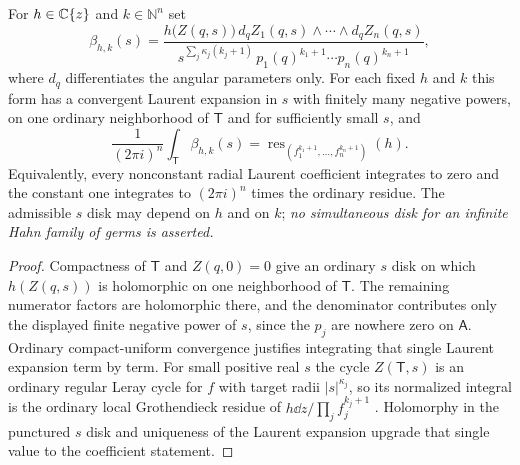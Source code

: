 \documentclass[11pt,letterpaper]{article}
\theoremstyle{definition}
\theoremstyle{remark}
\newcommand{\N}{\mathbb N}\newcommand{\Z}{\mathbb Z}\newcommand{\DD}{\mathbb D}
\newcommand{\res}{\operatorname{res}}\newcommand{\wind}{\operatorname{wind}}
\numberwithin{equation}{section}
\begin{document}
\begin{lemma}
\label{contours:lem:constantperiod}
For $h\in\mathbb C\{z\}$ and $k\in\N^n$ set
\begin{equation}\label{contours:eq:ordinaryform}
  \beta_{h,k}(s)=
  \frac{h\bigl(Z(q,s)\bigr)\,
    d_qZ_1(q,s)\wedge\cdots\wedge d_qZ_n(q,s)}
  {s^{\sum_j\kappa_j(k_j+1)}\,p_1(q)^{k_1+1}\cdots p_n(q)^{k_n+1}},
\end{equation}
where $d_q$ differentiates the angular parameters only. For each fixed $h$ and
$k$ this form has a convergent Laurent expansion in $s$ with finitely many
negative powers, on one ordinary neighborhood of $\mathsf T$ and for
sufficiently small $s$, and
\begin{equation}\label{contours:eq:constantperiod}
  \frac1{(2\pi i)^n}\int_{\mathsf T}\beta_{h,k}(s)
  =\res_{(f_1^{k_1+1},\ldots,f_n^{k_n+1})}(h).
\end{equation}
Equivalently, every nonconstant radial Laurent coefficient integrates to zero
and the constant one integrates to $(2\pi i)^n$ times the ordinary residue. The
admissible $s$ disk may depend on $h$ and on $k$; \emph{no simultaneous disk for
an infinite Hahn family of germs is asserted.}
\end{lemma}
\begin{proof}
Compactness of $\mathsf T$ and $Z(q,0)=0$ give an ordinary $s$ disk on which
$h(Z(q,s))$ is holomorphic on one neighborhood of $\mathsf T$. The remaining
numerator factors are holomorphic there, and the denominator contributes only
the displayed finite negative power of $s$, since the $p_j$ are nowhere zero on
$\mathsf A$. Ordinary compact-uniform convergence justifies integrating that single
Laurent expansion term by term. For small positive real $s$ the cycle
$Z(\mathsf T,s)$ is an ordinary regular Leray cycle for $f$ with target radii
$|s|^{\kappa_j}$, so its normalized integral is the ordinary local Grothendieck
residue of $h\dd z/\prod_jf_j^{k_j+1}$ \cite{GriffithsHarris,TajimaNabeshima}.
Holomorphy in the punctured $s$ disk and uniqueness of the Laurent expansion
upgrade that single value to the coefficient statement.
\end{proof}
\end{document}
